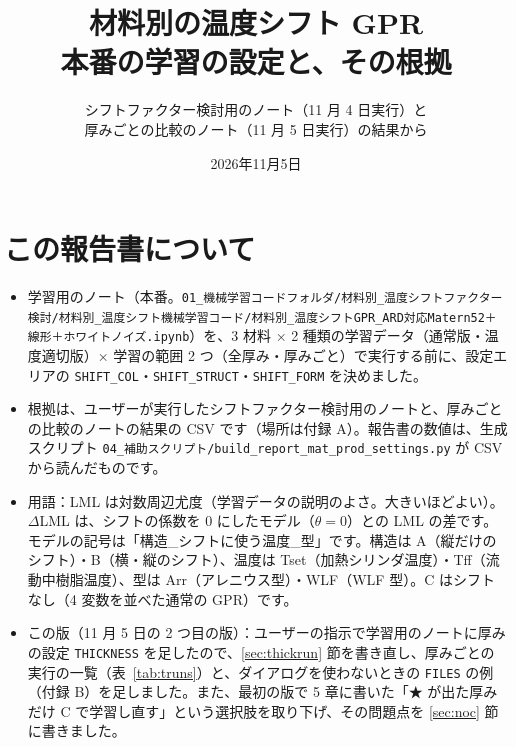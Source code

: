 \documentclass[paper=a4paper,fontsize=10.5pt,line_length=44zw,number_of_lines=40]{jlreq}
\title{材料別の温度シフト GPR\\本番の学習の設定と、その根拠}
\author{シフトファクター検討用のノート（11 月 4 日実行）と\\厚みごとの比較のノート（11 月 5 日実行）の結果から}
\date{2026年11月5日}
\begin{document}
\maketitle

\section*{この報告書について}
\begin{itemize}[itemsep=0.3ex,topsep=0.4ex]
\item 学習用のノート（本番。\texttt{01\_\allowbreak{}機械学習コードフォルダ/\allowbreak{}材料別\_\allowbreak{}温度シフトファクター検討/\allowbreak{}材料別\_\allowbreak{}温度シフト機械学習コード/\allowbreak{}材料別\_\allowbreak{}温度シフトGPR\_\allowbreak{}ARD対応Matern52＋線形＋ホワイトノイズ.ipynb}）を、3 材料 × 2 種類の学習データ（通常版・温度適切版）× 学習の範囲 2 つ（全厚み・厚みごと）で実行する前に、設定エリアの \texttt{SHIFT\_\allowbreak{}COL}・\texttt{SHIFT\_\allowbreak{}STRUCT}・\texttt{SHIFT\_\allowbreak{}FORM} を決めました。
\item 根拠は、ユーザーが実行したシフトファクター検討用のノートと、厚みごとの比較のノートの結果の CSV です（場所は付録 A）。報告書の数値は、生成スクリプト \texttt{04\_\allowbreak{}補助スクリプト/\allowbreak{}build\_\allowbreak{}report\_\allowbreak{}mat\_\allowbreak{}prod\_\allowbreak{}settings.py} が CSV から読んだものです。
\item 用語：LML は対数周辺尤度（学習データの説明のよさ。大きいほどよい）。$\Delta$LML は、シフトの係数を 0 にしたモデル（$\theta = 0$）との LML の差です。モデルの記号は「構造\_シフトに使う温度\_型」です。構造は A（縦だけのシフト）・B（横・縦のシフト）、温度は Tset（加熱シリンダ温度）・Tff（流動中樹脂温度）、型は Arr（アレニウス型）・WLF（WLF 型）。C はシフトなし（4 変数を並べた通常の GPR）です。
\item この版（11 月 5 日の 2 つ目の版）：ユーザーの指示で学習用のノートに厚みの設定 \texttt{THICKNESS} を足したので、\ref{sec:thickrun} 節を書き直し、厚みごとの実行の一覧（表~\ref{tab:truns}）と、ダイアログを使わないときの \texttt{FILES} の例（付録 B）を足しました。また、最初の版で 5 章に書いた「★ が出た厚みだけ C で学習し直す」という選択肢を取り下げ、その問題点を \ref{sec:noc} 節に書きました。
\end{itemize}
\end{document}
